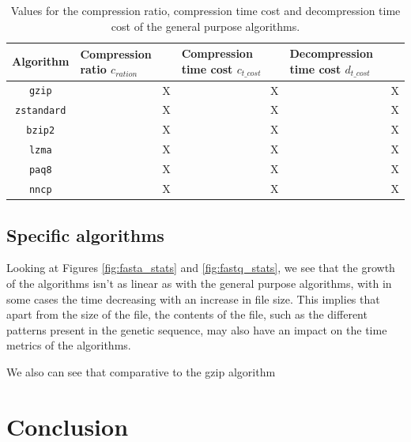     \begin{table}
        \caption{Values for the compression ratio, compression time cost and decompression time cost of the general purpose algorithms.}
        \label{table:general_purpose_values}
        \begin{center}
        \begin{tabular}{|| c | p{3cm} | p{3cm} | p{3cm} ||}
            \hline
            Algorithm & Compression ratio $c_{ration}$ & Compression time cost $c_{t\_cost}$ & Decompression time cost $d_{t\_cost}$ \\
            \hline
            \texttt{gzip} & \multicolumn{1}{r|}{X} & \multicolumn{1}{r|}{X} & \multicolumn{1}{r||}{X} \\

            \texttt{zstandard} & \multicolumn{1}{r|}{X} & \multicolumn{1}{r|}{X} & \multicolumn{1}{r||}{X} \\

            \texttt{bzip2} & \multicolumn{1}{r|}{X} & \multicolumn{1}{r|}{X} & \multicolumn{1}{r||}{X} \\

            \texttt{lzma} & \multicolumn{1}{r|}{X} & \multicolumn{1}{r|}{X} & \multicolumn{1}{r||}{X} \\

            \texttt{paq8} & \multicolumn{1}{r|}{X} & \multicolumn{1}{r|}{X} & \multicolumn{1}{r||}{X} \\

            \texttt{nncp} & \multicolumn{1}{r|}{X} & \multicolumn{1}{r|}{X} & \multicolumn{1}{r||}{X} \\
            
            \hline
        \end{tabular}
        \end{center}
    \end{table}


\subsection{Specific algorithms}

    Looking at Figures \ref{fig:fasta_stats} and \ref{fig:fastq_stats}, we see that the growth of the algorithms isn't as linear as with the general purpose algorithms, with in some cases the time decreasing with an increase in file size. This implies that apart from the size of the file, the contents of the file, such as the different patterns present in the genetic sequence, may also have an impact on the time metrics of the algorithms.

    We also can see that comparative to the gzip algorithm
    


    

\section{Conclusion}
